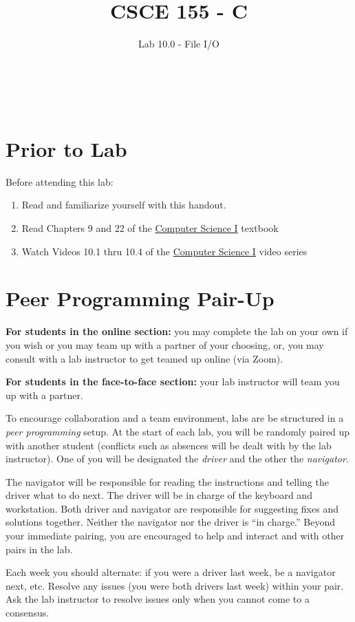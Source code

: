 \documentclass[12pt]{scrartcl}
\title{CSCE 155 - C}
\subtitle{Lab 10.0 - File I/O}
\author{~}
\date{~}
\begin{document}
\maketitle

\section*{Prior to Lab}

Before attending this lab:
\begin{enumerate}
  \item Read and familiarize yourself with this handout.
  \item Read Chapters 9 and 22 of the \href{http://cse.unl.edu/~cbourke/ComputerScienceOne.pdf}{Computer Science I} textbook
  \item Watch Videos 10.1 thru 10.4 of the \href{https://www.youtube.com/playlist?list=PL4IH6CVPpTZVkiEnCEOdGbYsFEdtKc5Bx}{Computer Science I} video series
\end{enumerate}

\section*{Peer Programming Pair-Up}

\textbf{For students in the online section:} you may complete
the lab on your own if you wish or you may team up with a partner
of your choosing, or, you may consult with a lab instructor to get
teamed up online (via Zoom).

\textbf{For students in the face-to-face section:} your
lab instructor will team you up with a partner.  

To encourage collaboration and a team environment, labs are be
structured in a \emph{peer programming} setup.  At the start of
each lab, you will be randomly paired up with another student 
(conflicts such as absences will be dealt with by the lab instructor).
One of you will be designated the \emph{driver} and the other
the \emph{navigator}.  

The navigator will be responsible for reading the instructions and
telling the driver what to do next.  The driver will be in charge of the
keyboard and workstation.  Both driver and navigator are responsible
for suggesting fixes and solutions together.  Neither the navigator
nor the driver is ``in charge.''  Beyond your immediate pairing, you
are encouraged to help and interact and with other pairs in the lab.

Each week you should alternate: if you were a driver last week, 
be a navigator next, etc.  Resolve any issues (you were both drivers
last week) within your pair.  Ask the lab instructor to resolve issues
only when you cannot come to a consensus.  
\end{document}
